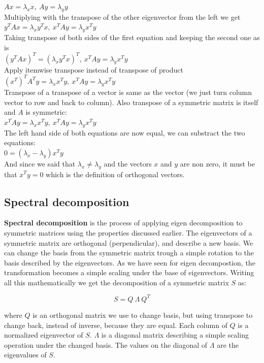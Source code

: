 \(Ax = \lambda_x x,\ Ay = \lambda_y y\)\\
Multiplying with the transpose of the other eigenvector from the left we get\\
\(y^TAx = \lambda_x y^T x,\ x^TAy = \lambda_y x^Ty\)\\
Taking transpose of both sides of the first equation and keeping the second one as is\\
\((y^TAx)^T = (\lambda_x y^T x)^T,\ x^TAy = \lambda_y x^Ty\)\\
Apply itemwise transpose instead of transpose of product\\
\((x^T)^TA^Ty = \lambda_x x^T y,\ x^TAy = \lambda_y x^Ty\)\\
Transpose of a transpose of a vector is same as the vector (we just turn column vector to row and back to column). Also transpose of a symmetric matrix is itself and \(A\) is symmetric:\\
\(x^TAy = \lambda_x x^T y,\ x^TAy = \lambda_y x^Ty\)\\
The left hand side of both equations are now equal, we can substract the two equations:\\
\(0 = (\lambda_x - \lambda_y)x^Ty\)\\
And since we said that \(\lambda_x \ne \lambda_y\) and the vectors \(x\) and \(y\) are non zero, it must be that \(x^Ty = 0\) which is the definition of orthogonal vectors.

\subsection{Spectral decomposition}

\textbf{Spectral decomposition} is the process of applying eigen decomposition to symmetric matrices using the properties discussed earlier. The eigenvectors of a symmetric matrix are orthogonal (perpendicular), and describe a new basis. We can change the basis from the symmetric matrix trough a simple rotation to the basis described by the eigenvectors. As we have seen for eigen decompostion, the transformation becomes a simple scaling under the base of eigenvectors. Writing all this mathematically we get the decomposition of a symmetric matrix \(S\) as:

\[S = Q\ \Lambda\ Q^T\]

where \(Q\) is an orthogonal matrix we use to change basis, but using transpose to change back, instead of inverse, because they are equal. Each column of \(Q\) is a normalized eigenvector of \(S\). \(\Lambda\) is a diagonal matrix describing a simple scaling operation under the changed basis. The values on the diagonal of \(\Lambda\) are the eigenvalues of \(S\).

